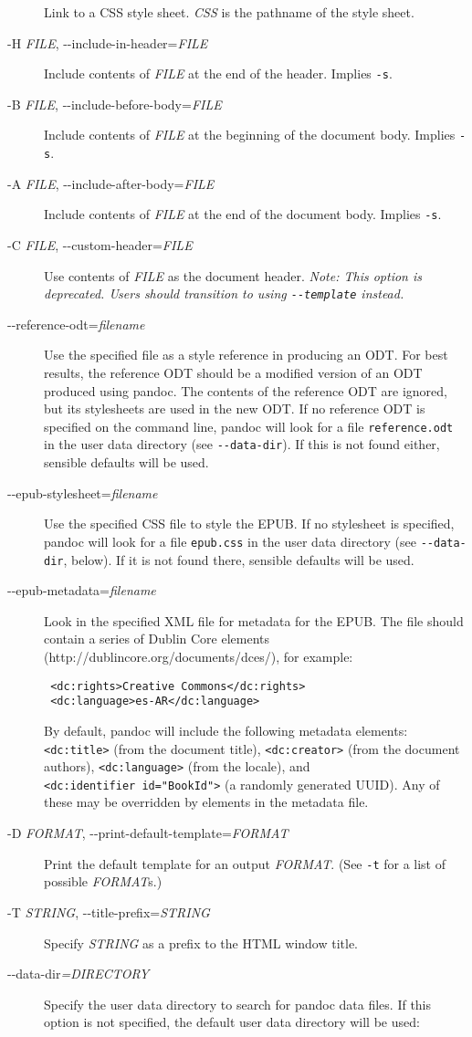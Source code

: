\documentclass[
  12pt,
  a4paper,
]{article}
\begin{document}
\begin{description}
Link to a CSS style sheet. \emph{CSS} is the pathname of the style sheet.
\item[-H \emph{FILE}, -\/-include-in-header=\emph{FILE}]
Include contents of \emph{FILE} at the end of the header. Implies \texttt{-s}.
\item[-B \emph{FILE}, -\/-include-before-body=\emph{FILE}]
Include contents of \emph{FILE} at the beginning of the document body. Implies
\texttt{-s}.
\item[-A \emph{FILE}, -\/-include-after-body=\emph{FILE}]
Include contents of \emph{FILE} at the end of the document body. Implies
\texttt{-s}.
\item[-C \emph{FILE}, -\/-custom-header=\emph{FILE}]
Use contents of \emph{FILE} as the document header. \emph{Note: This option is
deprecated. Users should transition to using \texttt{-\/-template} instead.}
\item[-\/-reference-odt=\emph{filename}]
Use the specified file as a style reference in producing an ODT. For best
results, the reference ODT should be a modified version of an ODT produced
using pandoc. The contents of the reference ODT are ignored, but its
stylesheets are used in the new ODT. If no reference ODT is specified on the
command line, pandoc will look for a file \texttt{reference.odt} in the user
data directory (see \texttt{-\/-data-dir}). If this is not found either,
sensible defaults will be used.
\item[-\/-epub-stylesheet=\emph{filename}]
Use the specified CSS file to style the EPUB. If no stylesheet is specified,
pandoc will look for a file \texttt{epub.css} in the user data directory (see
\texttt{-\/-data-dir}, below). If it is not found there, sensible defaults
will be used.
\item[-\/-epub-metadata=\emph{filename}]
Look in the specified XML file for metadata for the EPUB. The file should
contain a series of Dublin Core elements
(http://dublincore.org/documents/dces/), for example:

\begin{verbatim}
 <dc:rights>Creative Commons</dc:rights>
 <dc:language>es-AR</dc:language>
\end{verbatim}

By default, pandoc will include the following metadata elements:
\texttt{\textless{}dc:title\textgreater{}} (from the document title),
\texttt{\textless{}dc:creator\textgreater{}} (from the document authors),
\texttt{\textless{}dc:language\textgreater{}} (from the locale), and
\texttt{\textless{}dc:identifier\ id="BookId"\textgreater{}} (a randomly
generated UUID). Any of these may be overridden by elements in the metadata
file.
\item[-D \emph{FORMAT}, -\/-print-default-template=\emph{FORMAT}]
Print the default template for an output \emph{FORMAT}. (See \texttt{-t} for a
list of possible \emph{FORMAT}s.)
\item[-T \emph{STRING}, -\/-title-prefix=\emph{STRING}]
Specify \emph{STRING} as a prefix to the HTML window title.
\item[-\/-data-dir\emph{=DIRECTORY}]
Specify the user data directory to search for pandoc data files. If this
option is not specified, the default user data directory will be used:


\end{description}
\end{document}
